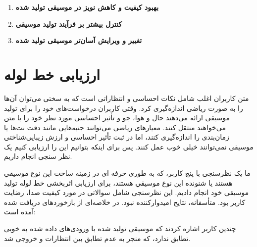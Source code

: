\begin{enumerate}
      \def\labelenumi{\arabic{enumi}.}
      \item
            \textbf{بهبود کیفیت و کاهش نویز در موسیقی تولید شده}
      \item
            \textbf{کنترل بیشتر بر فرآیند تولید موسیقی}
      \item
            \textbf{تغییر و ویرایش آسان‌تر موسیقی تولید شده}
\end{enumerate}

\section{ارزیابی خط لوله}
متن کاربران اغلب شامل نکات احساسی و انتظاراتی است که به سختی می‌توان آن‌ها را به صورت ریاضی اندازه‌گیری کرد. وقتی کاربران درخواست‌های خود را برای تولید موسیقی ارائه می‌دهند حال و هوا، جو و تأثیر احساسی مورد نظر خود را با متن می‌خواهند منتقل کنند. معیارهای ریاضی می‌توانند جنبه‌هایی مانند دقت نت‌ها یا زمان‌بندی را اندازه‌گیری کنند، اما در ثبت تأثیر احساسی و ارزش زیبایی‌شناختی موسیقی نمی‌توانند خیلی خوب عمل کنند. پس برای اینکه بتوانیم این  را ارزیابی کنیم یک  نظر سنجی انجام داریم.

ما یک نظرسنجی با پنج کاربر، که به طوری حرفه ای در زمینه ساخت این نوع موسیقي هستند یا شنونده این نوع موسیقي هستند، برای ارزیابی اثربخشی
خط لوله تولید موسیقی خود انجام دادیم. این نظرسنجی شامل سوالاتی در مورد
کیفیت صدا، رضایت کاربر بود. متأسفانه، نتایج امیدوارکننده
نبود. در  خلاصه‌ای از بازخوردهای دریافت شده آمده است:

\begin{table}[]
      \centering
      \label{tb:result}
      \caption{نتایج نظرسنجی ارزیابی خط لوله}
\end{table}
چندین کاربر اشاره کردند که موسیقی تولید شده با ورودی‌های داده شده به خوبی
تطابق ندارد، که منجر به عدم تطابق بین انتظارات و خروجی شد.

